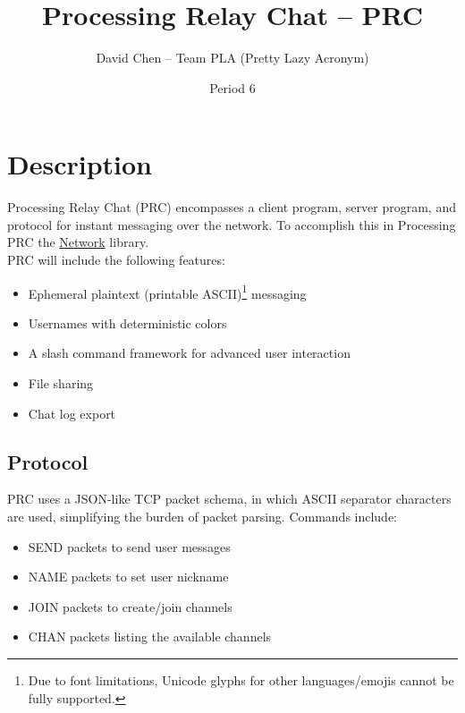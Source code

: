 \documentclass{article}
\title{Processing Relay Chat -- PRC}
\author{David Chen -- Team PLA (Pretty Lazy Acronym)}
\date{Period 6}
\begin{document}
\maketitle

\section{Description}
Processing Relay Chat (PRC) encompasses a client program, server program, and protocol for instant messaging over the network. To accomplish this in Processing PRC the \href{https://processing.org/reference/libraries/net/index.html}{Network} library.\\
PRC will include the following features:
\begin{itemize}
    \item Ephemeral plaintext (printable ASCII)\footnote{Due to font limitations, Unicode glyphs for other languages/emojis cannot be fully supported.} messaging
    \item Usernames with deterministic colors
    \item A slash command framework for advanced user interaction
    \item File sharing
    \item Chat log export
\end{itemize}

\subsection{Protocol}
PRC uses a JSON-like TCP packet schema, in which ASCII separator characters are used, simplifying the burden of packet parsing. Commands include:
\begin{itemize}
   \item SEND packets to send user messages
   \item NAME packets to set user nickname
   \item JOIN packets to create/join channels
   \item CHAN packets listing the available channels
\end{itemize}
\end{document}
